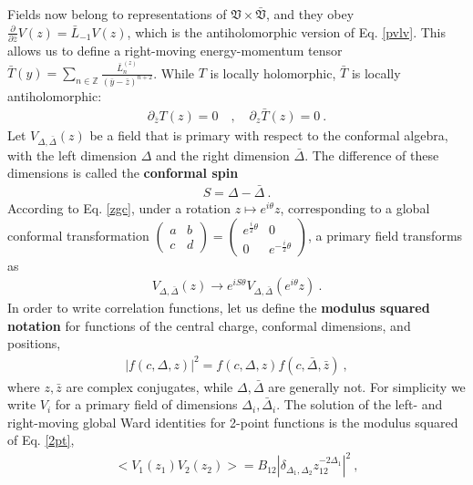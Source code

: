 \documentclass[12pt, a4paper]{article}
\newcommand{\myindex}[1]{\textbf{\boldmath #1}}
\begin{document}
Fields now belong to representations of $\mathfrak{V}\times \bar{\mathfrak{V}}$, and they obey $\frac{\partial}{\partial \bar z} V(z) = \bar L_{-1} V(z)$, which is the antiholomorphic version of Eq. \eqref{pvlv}. This allows us to define a right-moving energy-momentum tensor $\bar T(y) = \sum_{n\in\mathbb{Z}} \frac{\bar L_n^{(z)}}{(\bar y-\bar z)^{n+2}}$. While $T$ is locally holomorphic, $\bar T$ is locally antiholomorphic:
\begin{align}
 \partial_{\bar z} T(z) = 0 \quad , \quad \partial_z \bar T(z) = 0 \ . 
\end{align}
Let $V_{\Delta,\bar\Delta}(z)$ be a field that is primary with respect to the conformal algebra, with the left dimension $\Delta$ and the right dimension $\bar\Delta$. The difference of these dimensions is called the \myindex{conformal spin}
\begin{align}
 S = \Delta -\bar\Delta\ . 
 \label{sdd} 
\end{align}
According to Eq. \eqref{zgc}, 
under a rotation $z\mapsto e^{i\theta}z$, corresponding to a global conformal transformation $\left(\begin{smallmatrix} a & b \\ c & d\end{smallmatrix}\right)= \left(\begin{smallmatrix} e^{\frac{i}{2}\theta} & 0 \\ 0 &  e^{-\frac{i}{2}\theta}\end{smallmatrix}\right)$, a primary field transforms as 
\begin{align}
 V_{\Delta,\bar\Delta}(z) \to  e^{iS\theta} V_{\Delta,\bar\Delta}\left(e^{i\theta} z\right) \ .
 \label{veis}
\end{align}
In order to write correlation functions, let us define the \myindex{modulus squared notation} for functions of the central charge, conformal dimensions, and positions,
\begin{align}
 \left| f(c,\Delta, z)\right|^2 = f(c,\Delta, z)f(c,\bar\Delta,\bar z)\ ,
 \label{fdz2}
\end{align}
where $z,\bar z$ are complex conjugates, while $\Delta,\bar\Delta$ are generally not. 
For simplicity we write $V_i$ for a primary field of dimensions $\Delta_i,\bar\Delta_i$.
The solution of the left- and right-moving global Ward identities for 2-point functions is the modulus squared of Eq. \eqref{2pt},
\begin{align}
\boxed{ \Big< V_1(z_1)V_2(z_2) \Big> = B_{12} \left|\delta_{\Delta_1,\Delta_2} z_{12}^{-2\Delta_1}\right|^2} \ ,
\label{2ptb}
\end{align}
\end{document}
